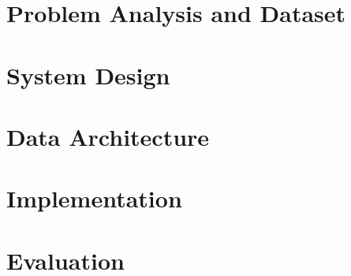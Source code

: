\documentclass[12pt]{report}
\begin{document}
\chapter{Problem Analysis and Dataset}
\label{chapter:problem}




\chapter{System Design}
\label{chapter:design}






\chapter{Data Architecture}
\label{chapter:architecture}



\chapter{Implementation}
\label{chapter:implementation}



\chapter{Evaluation}
\label{chapter:evaluation}
\end{document}

